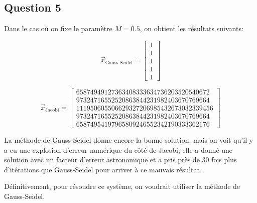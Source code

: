 \documentclass[10pt]{article}
\begin{document}
\subsection{Question 5}

Dans le cas où on fixe le paramètre $M=0.5$, on obtient les résultats
suivants:

\[
\vec{x}_{\text{Gauss-Seidel}} = \begin{bmatrix}
  1 \\ 1 \\ 1 \\ 1 \\ 1
\end{bmatrix} \tag{Itérations: 20}
\]

\[
\vec{x}_{\text{Jacobi}} = \begin{bmatrix}
  65874949127363408333634736203520540672 \\
  97324716552520863844231982403670769664 \\
  111950605506629327206985432673032339456 \\
  97324716552520863844231982403670769664 \\
  65874954197965809246552342190333362176
\end{bmatrix} \tag{Itérations: 578}
\]

La méthode de Gauss-Seidel donne encore la bonne solution, mais on
voit qu'il y a eu une explosion d'erreur numérique du côté de Jacobi;
elle a donné une solution avec un facteur d'erreur astronomique et a
pris près de 30 fois plus d'itérations que Gauss-Seidel pour arriver à
ce mauvais résultat.

Définitivement, pour résoudre ce système, on voudrait utiliser la
méthode de Gauss-Seidel.
\end{document}
